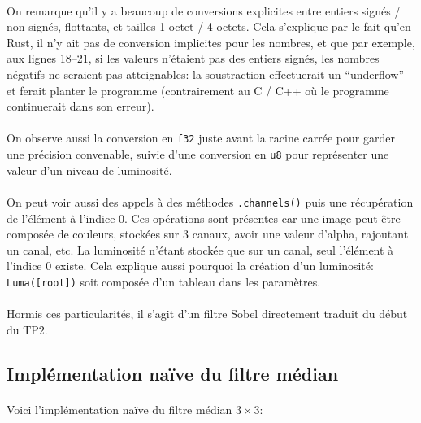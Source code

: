 \documentclass{report}
\begin{document}
\paragraph{} On remarque qu'il y a beaucoup de conversions explicites entre
entiers signés / non-signés, flottants, et tailles 1 octet / 4 octets. Cela
s'explique par le fait qu'en Rust, il n'y ait pas de conversion implicites pour
les nombres, et que par exemple, aux lignes 18--21, si les valeurs n'étaient
pas des entiers signés, les nombres négatifs ne seraient pas atteignables: la
soustraction effectuerait un ``underflow'' et ferait planter le programme
(contrairement au C / C++ où le programme continuerait dans son erreur).

\paragraph{} On observe aussi la conversion en \texttt{f32} juste
avant la racine carrée pour garder une précision convenable, suivie d'une
conversion en \texttt{u8} pour représenter une valeur d'un niveau
de luminosité.

\paragraph{} On peut voir aussi des appels à des méthodes
\texttt{.channels()} puis une récupération de l'élément à l'indice 0.
Ces opérations sont présentes car une image peut être composée de couleurs,
stockées sur 3 canaux, avoir une valeur d'alpha, rajoutant un canal, etc.
La luminosité n'étant stockée que sur un canal, seul l'élément à l'indice 0
existe. Cela explique aussi pourquoi la création d'un luminosité:
\texttt{Luma([root])} soit composée d'un tableau dans les paramètres.

\paragraph{} Hormis ces particularités, il s'agit d'un filtre Sobel directement
traduit du début du TP2.

\subsection{Implémentation naïve du filtre médian}

\paragraph{} Voici l'implémentation naïve du filtre médian $3 \times 3$:
\end{document}
